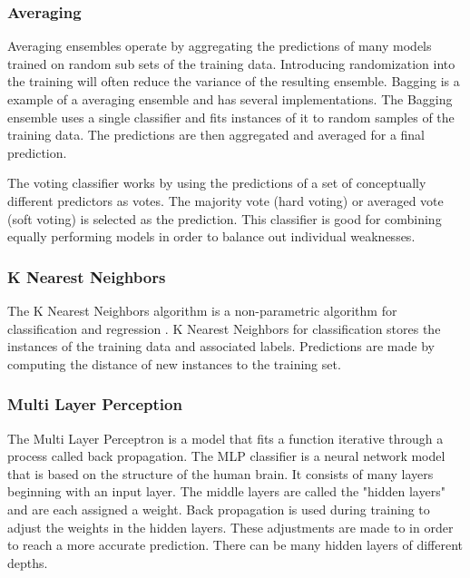 \subsubsection{Averaging}
Averaging ensembles operate by aggregating the predictions of many models trained on random sub sets of the training data.
Introducing randomization into the training will often reduce the variance of the resulting ensemble.
Bagging is a example of a averaging ensemble and has several implementations.
The Bagging ensemble uses a single classifier and fits instances of it to random samples of the training data.
The predictions are then aggregated and averaged for a final prediction.

The voting classifier works by using the predictions of a set of conceptually different predictors as votes.
The majority vote (hard voting) or averaged vote (soft voting) is selected as the prediction.
This classifier is good for combining equally performing models in order to balance out individual weaknesses.

\subsubsection{K Nearest Neighbors}
The K Nearest Neighbors algorithm is a non-parametric algorithm for classification and regression \cite{altman1992introduction}.
K Nearest Neighbors for classification stores the instances of the training data and associated labels.
Predictions are made by computing the distance of new instances to the training set.

\subsubsection{Multi Layer Perception}
The Multi Layer Perceptron is a model that fits a function iterative through a process called back propagation.
The MLP classifier is a neural network model that is based on the structure of the human brain.
It consists of many layers beginning with an input layer.
The middle layers are called the "hidden layers" and are each assigned a weight.
Back propagation is used during training to adjust the weights in the hidden layers.
These adjustments are made to in order to reach a more accurate prediction.
There can be many hidden layers of different depths.

